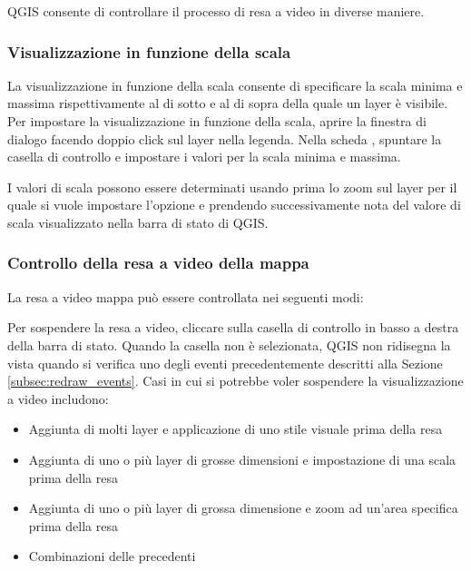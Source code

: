 QGIS consente di controllare il processo di resa a video in diverse maniere.

\subsubsection{Visualizzazione in funzione della scala}
\label{label_scaledepend}

La visualizzazione in funzione della scala consente di specificare la scala
minima e massima rispettivamente al di sotto e al di sopra della quale un
layer è visibile. Per impostare la visualizzazione in funzione della scala,
aprire la finestra di dialogo  facendo doppio click sul
layer nella legenda. Nella scheda , spuntare la casella di
controllo  e impostare i valori per la scala minima e massima.

I valori di scala possono essere determinati usando prima lo zoom sul layer per
il quale si vuole impostare l'opzione e prendendo successivamente nota del valore di scala
visualizzato nella barra di stato di QGIS.

\subsubsection{Controllo della resa a video della mappa}\label{label_controlmap}

La resa a video mappa può essere controllata nei seguenti modi:

\label{label_suspendrender}

Per sospendere la resa a video, cliccare sulla casella di controllo
 in basso a destra della barra di stato. Quando la casella
 non è selezionata, QGIS non ridisegna la vista quando si
verifica uno degli eventi precedentemente descritti alla Sezione
\ref{subsec:redraw_events}. Casi in cui si potrebbe voler sospendere la
visualizzazione a video includono:

\begin{itemize}
\item Aggiunta di molti layer e applicazione di uno stile visuale prima della
resa
\item Aggiunta di uno o più layer di grosse dimensioni e impostazione di una
scala prima della resa
\item Aggiunta di uno o più layer di grossa dimensione e zoom ad un'area specifica prima della resa
\item Combinazioni delle precedenti
\end{itemize}

